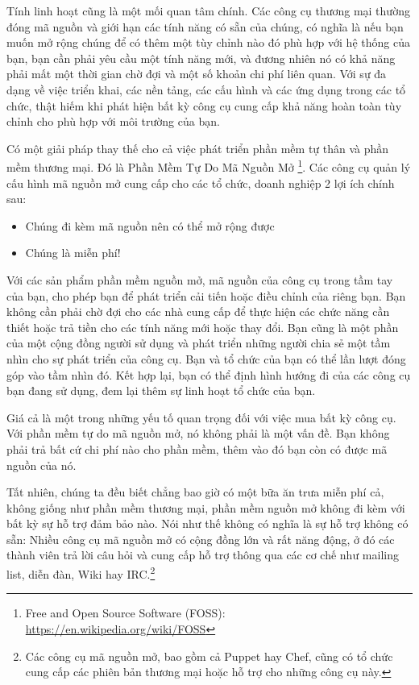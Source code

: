 Tính linh hoạt cũng là một mối quan tâm chính. Các công cụ thương mại thường đóng mã nguồn và giới hạn các tính năng có sẵn của chúng, có nghĩa là nếu bạn muốn mở rộng chúng để có thêm một tùy chỉnh nào đó phù hợp với hệ thống của bạn, bạn cần phải yêu cầu một tính năng mới, và đương nhiên nó có khả năng phải mất một thời gian chờ đợi và  một số khoản chi phí liên quan. Với sự đa dạng về việc triển khai, các nền tảng, các cấu hình và các ứng dụng trong các tổ chức, thật hiếm khi phát hiện bất kỳ công cụ cung cấp khả năng hoàn toàn tùy chỉnh cho phù hợp với môi trường của bạn.

Có một giải pháp thay thế cho cả việc phát triển phần mềm tự thân và phần mềm thương mại. Đó là Phần Mềm Tự Do Mã Nguồn Mở \footnote{Free and Open Source Software (FOSS): \url{https://en.wikipedia.org/wiki/FOSS}}. Các công cụ quản lý cấu hình mã nguồn mở cung cấp cho các tổ chức, doanh nghiệp 2 lợi ích chính sau:

\begin{itemize}
\item Chúng đi kèm mã nguồn nên có thể mở rộng được
\item Chúng là miễn phí!
\end{itemize}

Với các sản phẩm phần mềm nguồn mở, mã nguồn của công cụ trong tầm tay của bạn, cho phép bạn để phát triển cải tiến hoặc điều chỉnh của riêng bạn. Bạn không cần phải chờ đợi cho các nhà cung cấp để thực hiện các chức năng cần thiết hoặc trả tiền cho các tính năng mới hoặc thay đổi. Bạn cũng là một phần của một cộng đồng người sử dụng và phát triển những người chia sẻ một tầm nhìn cho sự phát triển của công cụ. Bạn và tổ chức của bạn có thể lần lượt đóng góp vào tầm nhìn đó. Kết hợp lại, bạn có thể định hình hướng đi của các công cụ bạn đang sử dụng, đem lại thêm sự linh hoạt tổ chức của bạn.

Giá cả là một trong những yếu tố quan trọng đối với việc mua bất kỳ công cụ. Với phần mềm tự do mã nguồn mở, nó không phải là một vấn đề. Bạn không phải trả bất cứ chi phí nào cho phần mềm, thêm vào đó bạn còn có được mã nguồn của nó.

Tất nhiên, chúng ta đều biết chẳng bao giờ có một bữa ăn trưa miễn phí cả, không giống như phần mềm thương mại, phần mềm nguồn mở không đi kèm với bất kỳ sự hỗ trợ đảm bảo nào. Nói như thế không có nghĩa là sự hỗ trợ không có sẵn: Nhiều công cụ mã nguồn mở có cộng đồng lớn và rất năng động, ở đó các thành viên trả lời câu hỏi và cung cấp hỗ trợ thông qua các cơ chế như mailing list, diễn đàn, Wiki hay IRC.\footnote{Các công cụ mã nguồn mở, bao gồm cả Puppet hay Chef, cũng có tổ chức cung cấp các phiên bản thương mại hoặc hỗ trợ cho những công cụ này.}
